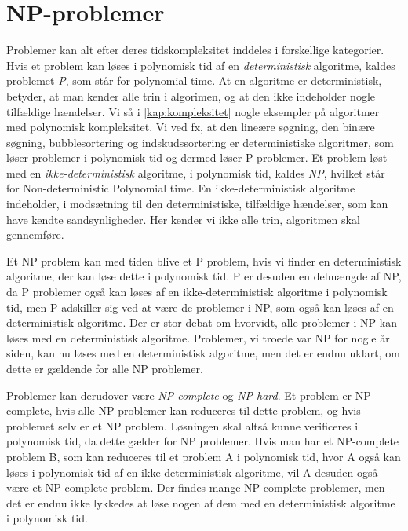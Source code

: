 \section{NP-problemer} \label{kap:np}
Problemer kan alt efter deres tidskompleksitet inddeles i forskellige kategorier. Hvis et problem kan løses i polynomisk tid af en \emph{deterministisk} algoritme, kaldes problemet \emph{P}, som står for polynomial time.
At en algoritme er deterministisk, betyder, at man kender alle trin i algorimen, og at den ikke indeholder nogle tilfældige hændelser. Vi så i \autoref{kap:kompleksitet} nogle eksempler på algoritmer med polynomisk kompleksitet. Vi ved fx, at den lineære søgning, den binære søgning, bubblesortering og indskudssortering er deterministiske algoritmer, som løser problemer i polynomisk tid og dermed løser P problemer. 
Et problem løst med en \emph{ikke-deterministisk} algoritme, i polynomisk tid, kaldes \emph{NP}, hvilket står for Non-deterministic Polynomial time. En ikke-deterministisk algoritme indeholder, i modsætning til den deterministiske, tilfældige hændelser, som kan have kendte sandsynligheder. Her kender vi ikke alle trin, algoritmen skal gennemføre. 

Et NP problem kan med tiden blive et P problem, hvis vi finder en deterministisk algoritme, der kan løse dette i polynomisk tid. P er desuden en delmængde af NP, da P problemer også kan løses af en ikke-deterministisk algoritme i polynomisk tid, men P adskiller sig ved at være de problemer i NP, som også kan løses af en deterministisk algoritme. 
Der er stor debat om hvorvidt, alle problemer i NP kan løses med en deterministisk algoritme. Problemer, vi troede var NP for nogle år siden, kan nu løses med en deterministisk algoritme, men det er endnu uklart, om dette er gældende for alle NP problemer.


Problemer kan derudover være \emph{NP-complete} og \emph{NP-hard}. Et problem er NP-complete, hvis alle NP problemer kan reduceres til dette problem, og hvis problemet selv er et NP problem. Løsningen skal altså kunne verificeres i polynomisk tid, da dette gælder for NP problemer. Hvis man har et NP-complete problem B, som kan reduceres til et problem A i polynomisk tid, hvor A også kan løses i polynomisk tid af en ikke-deterministisk algoritme, vil A desuden også være et NP-complete problem. Der findes mange NP-complete problemer, men det er endnu ikke lykkedes at løse nogen af dem med en deterministisk algoritme i polynomisk tid.

